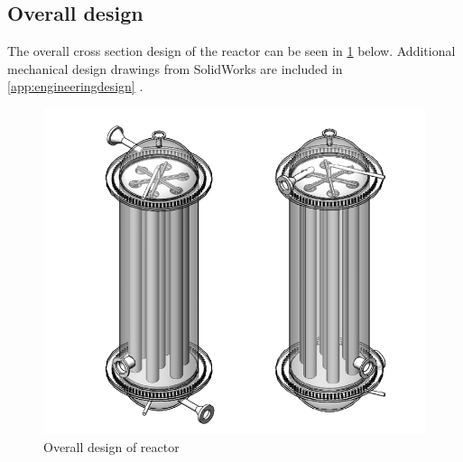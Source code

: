 \subsection{Overall design}
The overall cross section design of the reactor can be seen in \cref{fig:mainreactor} below. Additional mechanical design drawings from SolidWorks are included in \cref{app:engineeringdesign} .
\begin{figure}[h]
    \centering
    \includegraphics[width=0.6\linewidth]{chapters/2-reaction/figures/FYD reactor poster boy both.PNG}
    \caption{Overall design of reactor}
    \label{fig:mainreactor}
\end{figure}

